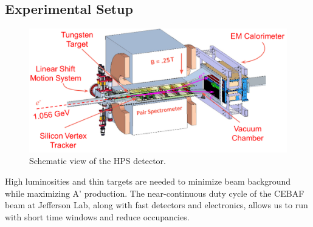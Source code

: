 \documentclass[b1]{sciposter}
\begin{document}
\begin{multicols}{3}
%

        \columnbreak
	\section*{Experimental Setup}
	\begin{figure}
		\begin{center}
                        \includegraphics[width=1.0\textwidth]{hps_detector}
			\caption{Schematic view of the HPS detector.}
		\end{center}
	\end{figure}

	High luminosities and thin targets are needed to minimize beam background while maximizing A' production.
	The near-continuous duty cycle of the CEBAF beam at Jefferson Lab, along with fast detectors and electronics, allows us to run with short time windows and reduce occupancies.


\end{multicols}
\end{document}
